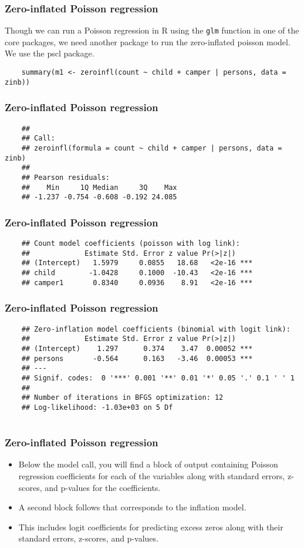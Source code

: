 \documentclass[MASTER.tex]{subfiles}
\begin{document}
\begin{frame}[fragile]
\frametitle{Zero-inflated Poisson regression}
	Though we can run a Poisson regression in R using the \texttt{glm} function in one of the core packages, we need another package to run the zero-inflated poisson model. We use the pscl package.
\begin{verbatim}
	summary(m1 <- zeroinfl(count ~ child + camper | persons, data = zinb))
\end{verbatim}
\end{frame}
\begin{frame}[fragile]
\frametitle{Zero-inflated Poisson regression}
\begin{verbatim}
	## 
	## Call:
	## zeroinfl(formula = count ~ child + camper | persons, data = zinb)
	## 
	## Pearson residuals:
	##    Min     1Q Median     3Q    Max 
	## -1.237 -0.754 -0.608 -0.192 24.085 
\end{verbatim}
\end{frame}
\begin{frame}[fragile]
\frametitle{Zero-inflated Poisson regression}
\begin{verbatim}
	## Count model coefficients (poisson with log link):
	##             Estimate Std. Error z value Pr(>|z|)    
	## (Intercept)   1.5979     0.0855   18.68   <2e-16 ***
	## child        -1.0428     0.1000  -10.43   <2e-16 ***
	## camper1       0.8340     0.0936    8.91   <2e-16 ***
\end{verbatim}
\end{frame}
\begin{frame}[fragile]
	\frametitle{Zero-inflated Poisson regression}
	\begin{verbatim}
	## Zero-inflation model coefficients (binomial with logit link):
	##             Estimate Std. Error z value Pr(>|z|)    
	## (Intercept)    1.297      0.374    3.47  0.00052 ***
	## persons       -0.564      0.163   -3.46  0.00053 ***
	## ---
	## Signif. codes:  0 '***' 0.001 '**' 0.01 '*' 0.05 '.' 0.1 ' ' 1 
	## 
	## Number of iterations in BFGS optimization: 12 
	## Log-likelihood: -1.03e+03 on 5 Df
	
\end{verbatim}
\end{frame}

\begin{frame}[fragile]
\frametitle{Zero-inflated Poisson regression}
\begin{itemize}
\item	Below the model call, you will find a block of output containing Poisson regression coefficients for each of the variables along with standard errors, z-scores, and p-values for the coefficients. 
\item A second block follows that corresponds to the inflation model. 
\item This includes logit coefficients for predicting excess zeros along with their standard errors, z-scores, and p-values.
\end{itemize}
\end{frame}
\end{document}
